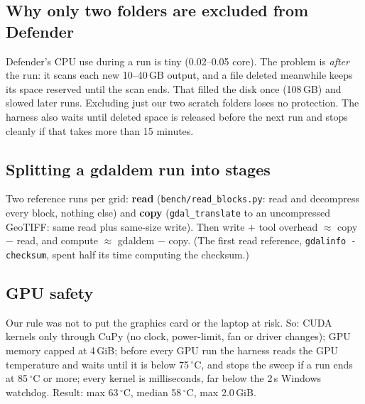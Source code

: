 ﻿\documentclass[11pt,a4paper]{article}
\newcommand{\code}[1]{\texttt{#1}}
\begin{document}
\subsection{Why only two folders are excluded from Defender}
Defender's CPU use during a run is tiny (0.02--0.05 core). The problem is \emph{after} the run: it scans each new
10--40\,GB output, and a file deleted meanwhile keeps its space reserved until the scan ends. That filled the disk once
(108\,GB) and slowed later runs. Excluding just our two scratch folders loses no protection. The harness also waits until
deleted space is released before the next run and stops cleanly if that takes more than 15 minutes.

\subsection{Splitting a gdaldem run into stages}
Two reference runs per grid: \textbf{read} (\code{bench/read\_blocks.py}: read and decompress every block, nothing else)
and \textbf{copy} (\code{gdal\_translate} to an uncompressed GeoTIFF: same read plus same-size write). Then write + tool
overhead $\approx$ copy $-$ read, and compute $\approx$ gdaldem $-$ copy. (The first read reference, \code{gdalinfo
-checksum}, spent half its time computing the checksum.)

\subsection{GPU safety}
Our rule was not to put the graphics card or the laptop at risk. So: CUDA kernels only through CuPy (no clock,
power-limit, fan or driver changes); GPU memory capped at 4\,GiB; before every GPU run the harness reads the GPU
temperature and waits until it is below 75\,$^\circ$C, and stops the sweep if a run ends at 85\,$^\circ$C or more; every
kernel is milliseconds, far below the 2\,s Windows watchdog. Result: max 63\,$^\circ$C, median 58\,$^\circ$C, max 2.0\,GiB.
\end{document}
